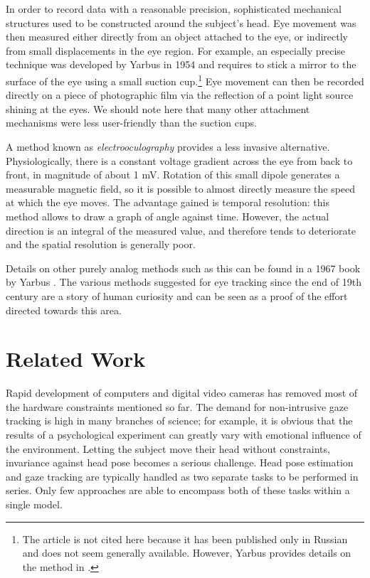 In order to record data with a reasonable precision, sophisticated mechanical structures used to be constructed around the subject's head.
Eye movement was then measured either directly from an object attached to the eye, or indirectly from small displacements in the eye region.
For example, an especially precise technique was developed by Yarbus in 1954 and requires to stick a mirror to the surface of the eye using a small suction cup.\footnote{
The article is not cited here because it has been published only in Russian and does not seem generally available.
However, Yarbus provides details on the method in \cite{yarbus67}.
}
Eye movement can then be recorded directly on a piece of photographic film via the reflection of a point light source shining at the eyes.
We should note here that many other attachment mechanisms were less user-friendly than the suction cups.

A method known as \textit{electrooculography} provides a less invasive alternative.
Physiologically, there is a constant voltage gradient across the eye from back to front, in magnitude of about 1 mV.
Rotation of this small dipole generates a measurable magnetic field, so it is possible to almost directly measure the speed at which the eye moves.
The advantage gained is temporal resolution: this method allows to draw a graph of angle against time.
However, the actual direction is an integral of the measured value, and therefore tends to deteriorate and the spatial resolution is generally poor.

Details on other purely analog methods such as this can be found in a 1967 book by Yarbus \cite{yarbus67}.
The various methods suggested for eye tracking since the end of 19th century are a story of human curiosity and can be seen as a proof of the effort directed towards this area.

\section{Related Work}

Rapid development of computers and digital video cameras has removed most of the hardware constraints mentioned so far.
The demand for non-intrusive gaze tracking is high in many branches of science; for example, it is obvious that the results of a psychological experiment can greatly vary with emotional influence of the environment.
Letting the subject move their head without constraints, invariance against head pose becomes a serious challenge.
Head pose estimation and gaze tracking are typically handled as two separate tasks to be performed in series.
Only few approaches are able to encompass both of these tasks within a single model.

